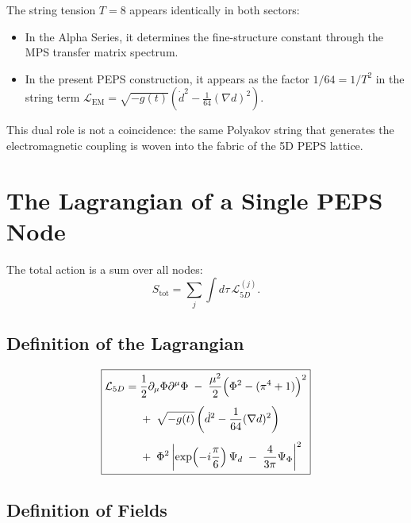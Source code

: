 \documentclass[12pt]{article}
\begin{document}
The string tension \(T = 8\) appears identically in both sectors:
\begin{itemize}
    \item In the Alpha Series, it determines the fine-structure constant through the MPS transfer matrix spectrum.
    \item In the present PEPS construction, it appears as the factor \(1/64 = 1/T^2\) in the string term \(\mathcal{L}_{\text{EM}} = \sqrt{-g(t)}(\dot{d}^2 - \frac{1}{64}(\nabla d)^2)\).
\end{itemize}
This dual role is not a coincidence: the same Polyakov string \cite{Polyakov1987} that generates the electromagnetic coupling is woven into the fabric of the 5D PEPS lattice.

\section{The Lagrangian of a Single PEPS Node}

The total action is a sum over all nodes:
\[
S_{\text{tot}} = \sum_{j} \int d\tau \, \mathcal{L}_{5D}^{(j)}.
\]

\subsection{Definition of the Lagrangian}

\[
\boxed{\begin{aligned}
\mathcal{L}_{5D} = &\;\frac{1}{2}\partial_\mu\Phi\partial^\mu\Phi \;-\; \frac{\mu^2}{2}\Bigl(\Phi^2 - (\pi^4 + 1)\Bigr)^2 \\[4pt]
&\;+\; \sqrt{-g(t)}\left( \dot{d}^2 - \frac{1}{64}(\nabla d)^2 \right) \\[4pt]
&\;+\; \Phi^2 \left| \exp\!\left(-i\frac{\pi}{6}\right) \Psi_d \;-\; \frac{4}{3\pi} \Psi_{\Phi} \right|^2
\end{aligned}}
\]

\subsection{Definition of Fields}
\end{document}
